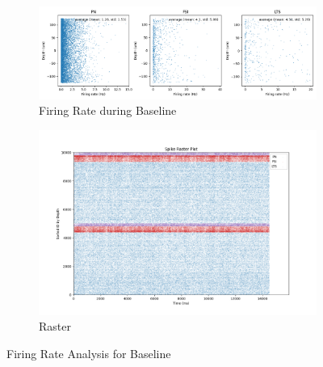 \documentclass[12pt, letterpaper]{article}
\begin{document}
\begin{figure}[H]
  \centering
  \begin{subfigure}{\textwidth}
    \centering
    \includegraphics[width=\textwidth]{output/baseline-spikes}
    \caption{Firing Rate during Baseline}
    \label{fig:baseline-spikes}
  \end{subfigure}
  \begin{subfigure}{\textwidth}
    \centering
    \includegraphics[width=\textwidth]{output/baseline-raster}
    \caption{Raster}
    \label{fig:baseline-raster}
  \end{subfigure}
  \caption{Firing Rate Analysis for Baseline}
\end{figure}
\end{document}
